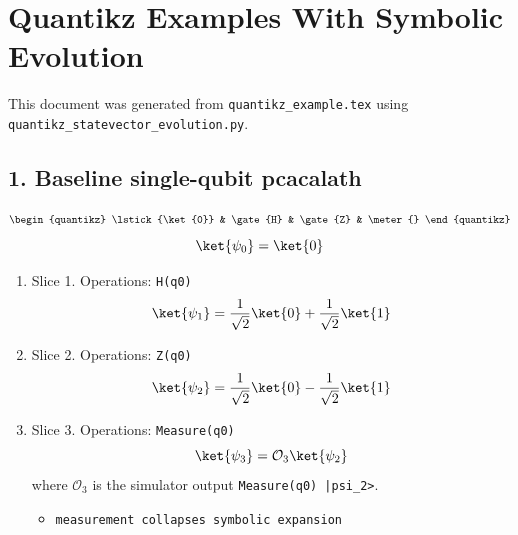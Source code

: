 \documentclass{article}
\begin{document}
\section*{Quantikz Examples With Symbolic Evolution}
This document was generated from \verb|quantikz_example.tex| using \verb|quantikz_statevector_evolution.py|.

\subsection*{1. Baseline single-qubit pcacalath}
\[
\begin{quantikz}
\lstick{\ket{0}} & \gate{H} & \gate{Z} & \meter{}
\end{quantikz}
\]
\[
\ket{\psi_0} = \ket{0}
\]
\begin{enumerate}
\item Slice 1. Operations: \verb|H(q0)|
\[
\ket{\psi_1} = \frac{1}{\sqrt{2}} \ket{0} + \frac{1}{\sqrt{2}} \ket{1}
\]
\item Slice 2. Operations: \verb|Z(q0)|
\[
\ket{\psi_2} = \frac{1}{\sqrt{2}} \ket{0} - \frac{1}{\sqrt{2}} \ket{1}
\]
\item Slice 3. Operations: \verb|Measure(q0)|
\[
\ket{\psi_3} = \mathcal{O}_{3}\ket{\psi_{2}}
\]
\noindent where $\mathcal{O}_{3}$ is the simulator output \verb!Measure(q0) |psi_2>!.
\begin{itemize}
\item \verb|measurement collapses symbolic expansion|
\end{itemize}
\end{enumerate}
\end{document}
